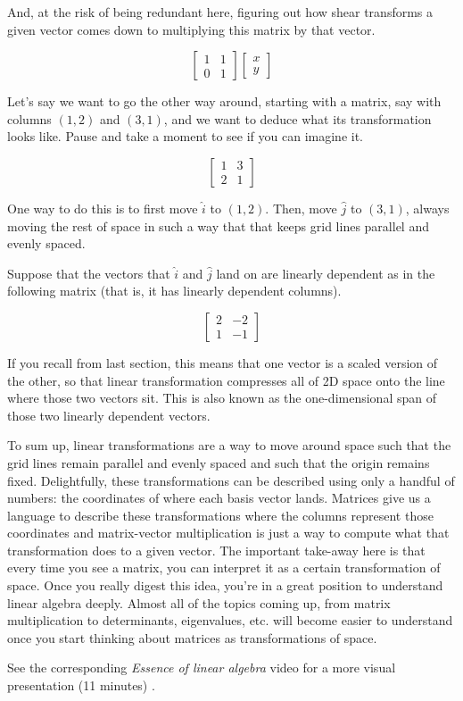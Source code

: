And, at the risk of being redundant here, figuring out how shear transforms a
given vector comes down to multiplying this matrix by that vector.

\begin{equation*}
  \begin{bmatrix}
    1 & 1 \\
    0 & 1
  \end{bmatrix} \begin{bmatrix}
    x \\
    y
  \end{bmatrix}
\end{equation*}

Let's say we want to go the other way around, starting with a matrix, say with
columns $(1, 2)$ and $(3, 1)$, and we want to deduce what its transformation
looks like. Pause and take a moment to see if you can imagine it.

\begin{equation*}
  \begin{bmatrix}
    1 & 3 \\
    2 & 1
  \end{bmatrix}
\end{equation*}

One way to do this is to first move $\hat{i}$ to $(1, 2)$. Then, move $\hat{j}$
to $(3, 1)$, always moving the rest of space in such a way that that keeps grid
lines parallel and evenly spaced.

Suppose that the vectors that $\hat{i}$ and $\hat{j}$ land on are linearly
dependent as in the following matrix (that is, it has linearly dependent
columns).

\begin{equation*}
  \begin{bmatrix}
    2 & -2 \\
    1 & -1
  \end{bmatrix}
\end{equation*}

If you recall from last section, this means that one vector is a scaled version
of the other, so that linear transformation compresses all of 2D space onto the
line where those two vectors sit. This is also known as the one-dimensional span
of those two linearly dependent vectors.

To sum up, linear transformations are a way to move around space such that the
grid lines remain parallel and evenly spaced and such that the origin remains
fixed. Delightfully, these transformations can be described using only a handful
of numbers: the coordinates of where each basis vector lands. Matrices give us a
language to describe these transformations where the columns represent those
coordinates and matrix-vector multiplication is just a way to compute what that
transformation does to a given vector. The important take-away here is that
every time you see a matrix, you can interpret it as a certain transformation of
space. Once you really digest this idea, you're in a great position to
understand linear algebra deeply. Almost all of the topics coming up, from
matrix multiplication to determinants, eigenvalues, etc. will become easier to
understand once you start thinking about matrices as transformations of space.

\begin{remark}
  See the corresponding \textit{Essence of linear algebra} video for a more
  visual presentation (11 minutes)
  \cite{bib:linalg_linear_transformations_and_matrices}.
\end{remark}

